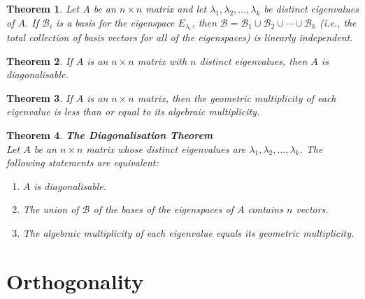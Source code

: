 \documentclass{article}
\theoremstyle{sltheorem}
\newtheorem{theorem}{Theorem}[section]
\begin{document}
\begin{theorem}
    Let $A$ be an $n\times n$ matrix and let $\lambda_1, \lambda_2, ..., \lambda_k$ be distinct eigenvalues of $A$. If $\mathcal{B}_i$ is a basis for the eigenspace $E_{\lambda_i}$, then $\mathcal{B} = \mathcal{B}_1\cup\mathcal{B}_2\cup\cdots\cup\mathcal{B}_k$ (i.e., the total collection of basis vectors for all of the eigenspaces) is linearly independent.
\end{theorem}
\begin{theorem}
    If $A$ is an $n\times n$ matrix with $n$ distinct eigenvalues, then $A$ is diagonalisable.
\end{theorem}
\begin{theorem}
    If $A$ is an $n\times n$ matrix, then the geometric multiplicity of each eigenvalue is less than or equal to its algebraic multiplicity.
\end{theorem}
\begin{theorem}
    \textbf{The Diagonalisation Theorem}\\
    Let $A$ be an $n\times n$ matrix whose distinct eigenvalues are $\lambda_1, \lambda_2, ...,\lambda_k$. The following statements are equivalent:
    \begin{enumerate}
        \item $A$ is diagonalisable.
        \item The union of $\mathcal{B}$ of the bases of the eigenspaces of $A$ contains $n$ vectors.
        \item The algebraic multiplicity of each eigenvalue equals its geometric multiplicity.
    \end{enumerate}

\end{theorem}
\section{Orthogonality}
\end{document}
